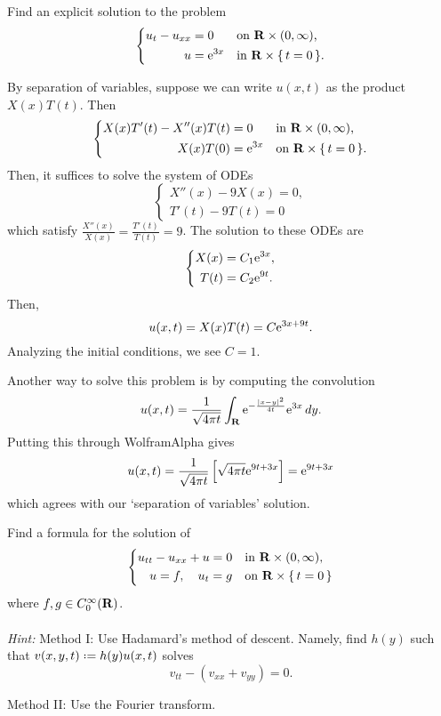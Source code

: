 \begin{problem}
  Find an explicit solution to the problem
  \[
    \left\{
      \begin{aligned}
        u_t-u_{xx}&=0&&\text{on \(\mathbf{R}\times(0,\infty)\),}\\
        u&=\mathrm{e}^{3x}&&\text{in \(\mathbf{R}\times\{\,t=0\,\}\).}
      \end{aligned}
    \right.
  \]
\end{problem}
\begin{solution*}
  By separation of variables, suppose we can write \(u(x,t)\) as the
  product \(X(x)T(t)\). Then
  \[
    \left\{
      \begin{aligned}
        X(x)T'(t)-X''(x)T(t)&=0&&\text{in \(\mathbf{R}\times(0,\infty)\),}\\
        X(x)T(0)&=\mathrm{e}^{3x}&&\text{on \(\mathbf{R}\times\{\,t=0\,\}\).}
      \end{aligned}
    \right.
  \]
  Then, it suffices to solve the system of ODEs
  \[
    \left\{
      \begin{aligned}
        X''(x)-9X(x)=0,\\
        T'(t)-9T(t)=0
      \end{aligned}
    \right.
  \]
  which satisfy \(\frac{X''(x)}{X(x)}=\frac{T'(t)}{T(t)}=9\). The solution
  to these ODEs are
  \[
    \left\{%
      \begin{aligned}
        X(x)&=C_1\rme^{3x},\\
        T(t)&=C_2\rme^{9t}.
      \end{aligned}
    \right.
  \]
  Then,
  \[
    u(x,t)=X(x)T(t)=C\mathrm{e}^{3x+9t}.
  \]
  Analyzing the initial conditions, we see \(C=1\).

  Another way to solve this problem is by computing the convolution
  \[
    u(x,t)=%
    \frac{1}{\sqrt{4\pi t}}
    \int_\R \rme^{-\frac{|x-y|^2}{4t}}
    \rme^{3x}\diff y.
  \]
  Putting this through \textsf{WolframAlpha} gives
  \[
    u(x,t)=%
    \frac{1}{\sqrt{4\pi t}}%
    \left[%
      \sqrt{4\pi t}\rme^{9t+3x}%
    \right]=%
    \rme^{9t+3x}
  \]
  which agrees with our `separation of variables' solution.
\end{solution*}

\begin{problem}
  Find a formula for the solution of
  \[
    \left\{
      \begin{aligned}
        u_{tt}-u_{xx}+u=0&&&\text{in \(\mathbf{R}\times(0,\infty)\),}\\
        u=f,\quad u_t=g&&&\text{on \(\mathbf{R}\times\{\,t=0\,\}\)}
      \end{aligned}
    \right.
  \]
  where \(f,g\in C_0^\infty(\mathbf{R})\).
  \\\\
  \emph{Hint:} Method I: Use Hadamard's method of
  descent. Namely, find \(h(y)\) such that \(v(x,y,t)\defeq h(y)u(x,t)\)
  solves
  \[
    v_{tt}-(v_{xx}+v_{yy})=0.
  \]

  \noindent Method II: Use the Fourier transform.
\end{problem}
\begin{solution*}
\end{solution*}

